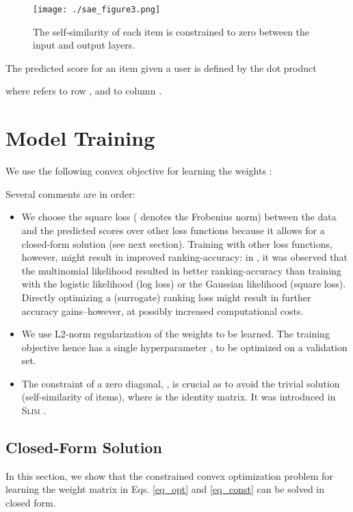 \documentclass[sigconf]{acmart}
\newcommand{\slim}{{\scshape Slim}}
\begin{document}
\begin{figure}[t]
\begin{center}
\texttt{[image: ./sae\_figure3.png]}
\end{center}
\caption{The self-similarity of each item is constrained  to zero between the input and output layers.}
\label{fig_sae}
\end{figure}


The predicted score    for an item  given a user   is defined by the dot product

where  refers to  row , and   to column . 
\section{Model Training}
We use the following convex objective for learning the weights :

Several comments are in order:
\begin{itemize}
\item We choose the square loss ( denotes the Frobenius norm) between the data  and the predicted scores   over other loss functions because it allows for a closed-form solution (see next section). Training with other loss functions, however, might result in improved ranking-accuracy: in \cite{liang18}, it was observed that  the multinomial likelihood resulted in better ranking-accuracy than training with the logistic likelihood (log loss) or the Gaussian likelihood (square loss).  Directly optimizing a (surrogate) ranking loss might result in further accuracy gains--however, at possibly increased computational costs.
\item We use L2-norm regularization of the weights  to be learned. The training objective hence has a single hyperparameter , to be optimized on a  validation set.

\item The constraint of a zero diagonal, ,  is crucial as to avoid the trivial solution  (self-similarity of items), where  is the identity matrix. It was introduced in \slim{} \cite{ning11}.
\end{itemize}



\subsection{Closed-Form Solution}
\label{sec_closedform}
In this section, we show that the constrained convex optimization problem for learning the weight matrix  in Eqs. \ref{eq_opt} and \ref{eq_const} can be solved in closed form. 
\end{document}
